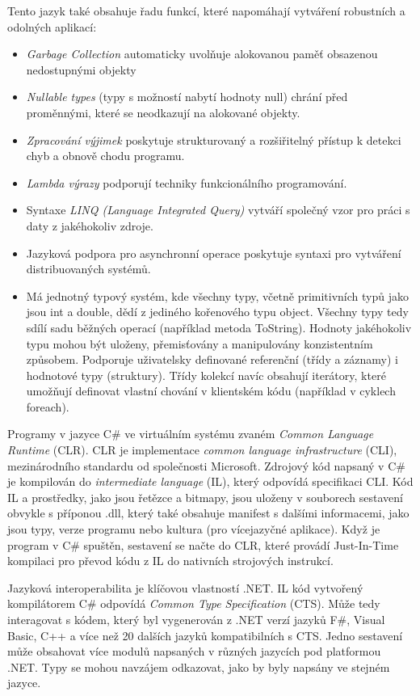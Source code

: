 Tento jazyk také obsahuje řadu funkcí, které napomáhají vytváření robustních a odolných aplikací:

\begin{itemize}
    \item {\it Garbage Collection} automaticky uvolňuje alokovanou paměť obsazenou nedostupnými objekty
    \item {\it Nullable types} (typy s možností nabytí hodnoty null) chrání před proměnnými, které se neodkazují na alokované objekty.
    \item {\it Zpracování výjimek} poskytuje strukturovaný a rozšiřitelný přístup k detekci chyb a obnově chodu programu.
    \item {\it Lambda výrazy} podporují techniky funkcionálního programování.
    \item Syntaxe {\it LINQ (Language Integrated Query)} vytváří společný vzor pro práci s daty z jakéhokoliv zdroje.
    \item Jazyková podpora pro asynchronní operace poskytuje syntaxi pro vytváření distribuovaných systémů.
    \item Má jednotný typový systém, kde všechny typy, včetně primitivních typů jako jsou int a double, dědí z jediného kořenového typu object. Všechny typy tedy sdílí sadu běžných operací (například metoda ToString). Hodnoty jakéhokoliv typu mohou být uloženy, přemisťovány a manipulovány konzistentním způsobem. Podporuje uživatelsky definované referenční (třídy a záznamy) i hodnotové typy (struktury). Třídy kolekcí navíc obsahují iterátory, které umožňují definovat vlastní chování v klientském kódu (například v cyklech foreach).
\end{itemize}

Programy v jazyce C\# ve virtuálním systému zvaném {\it Common Language Runtime} (CLR). CLR je implementace {\it common language infrastructure} (CLI), mezinárodního standardu od společnosti Microsoft. Zdrojový kód napsaný v C\# je kompilován do {\it intermediate language} (IL), který odpovídá specifikaci CLI. Kód IL a prostředky, jako jsou řetězce a bitmapy, jsou uloženy v souborech sestavení obvykle s příponou .dll, který také obsahuje manifest s dalšími informacemi, jako jsou typy, verze programu nebo kultura (pro vícejazyčné aplikace). Když je program v C\# spuštěn, sestavení se načte do CLR, které provádí Just-In-Time kompilaci pro převod kódu z IL do nativních strojových instrukcí.

Jazyková interoperabilita je klíčovou vlastností .NET. IL kód vytvořený kompilátorem C\# odpovídá {\it Common Type Specification} (CTS). Může tedy interagovat s kódem, který byl vygenerován z .NET verzí jazyků F\#, Visual Basic, C++ a více než 20 dalších jazyků kompatibilních s CTS. Jedno sestavení může obsahovat více modulů napsaných v různých jazycích pod platformou .NET. Typy se mohou navzájem odkazovat, jako by byly napsány ve stejném jazyce.

